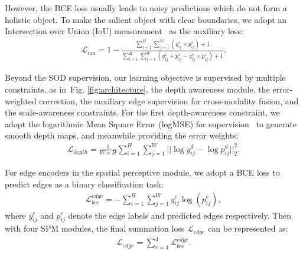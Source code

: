 \documentclass[journal]{IEEEtran}
\newcommand{\figref}[1]{Fig. \ref{#1}}
\newcommand{\mc}[1]{\mathcal{#1}}
\begin{document}
However, the BCE loss usually leads to noisy predictions which do not form a holistic object. To make the salient object with clear boundaries, we adopt an Intersection over Union (IoU) measurement~\cite{F3Net, qin2019basnet} as the auxiliary loss:
\begin{equation} \label{eq:iou}
\begin{split}
\mc{L}_{iou} = 1-\frac{\sum_{i=1}^{H}\sum_{j=1}^{W} (y^s_{ij}\times p^s_{ij})+1}{\sum_{i=1}^{H}\sum_{j=1}^{W}(y^s_{ij}+p^s_{ij}-y^s_{ij}\times p^s_{ij})+1}.
\end{split}
\end{equation}



Beyond the SOD supervision, our learning objective is supervised by multiple constraints, as in~\figref{fig:architecture}, the depth awareness module, the error-weighted correction, the auxiliary edge supervision for cross-modality fusion, and the scale-awareness constraints.
For the first depth-awareness constraint, we adopt the logarithmic Mean Square Error (logMSE) for supervision~\cite{eigen2014depth,eigen2015predicting} to generate smooth depth maps, and meanwhile providing the error weights:
\begin{equation} \label{eq:logmse}
\begin{split}
\mc{L}_{depth} = \frac{1}{W\times H}\sum_{i=1}^{H}\sum_{j=1}^{W} || \log y^d_{ij} - \log p^d_{ij} ||^2_2.
\end{split}
\end{equation}

For edge encoders in the spatial perceptive module, we adopt a BCE loss to predict edges as a binary classification task:
\begin{equation}\label{eq:edge bce}
\begin{split}
\mc{L}_{bce}^{edge} = -\sum_{i=1}^{H}\sum_{j=1}^{W}y^e_{ij}\log(p^e_{ij}),
\end{split}
\end{equation}
where $y^e_{ij}$ and $p^e_{ij}$ denote the edge labels and predicted edges respectively. Then with four SPM modules, the final summation loss $\mc{L}_{edge}$ can be represented as:
\begin{equation}\label{eq:edge bce sum}
\begin{split}
\mc{L}_{edge} = \sum_{e=1}^{4}\mc{L}_{bce}^{edge}.
\end{split}
\end{equation}
\end{document}
